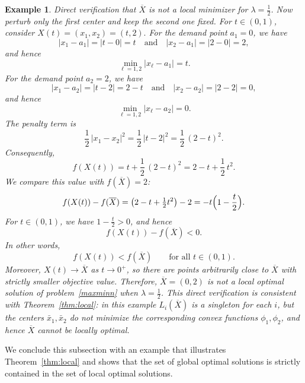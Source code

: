 \documentclass[11pt]{article}
\newtheorem{example}[theorem]{Example}
\theoremstyle{definition}
\newcommand{\1}{\mathbf{1}}
\def\Bar{\overline}
\begin{document}
\begin{example}
{\emph{Direct verification that $\Bar X$ is not a local minimizer for $\lambda=\tfrac12$.}
Now perturb only the first center and keep the second one fixed.
For $t\in(0,1)$, consider $X(t)=(x_1,x_2)=(t,2).$
For the demand point $a_1=0$, we have
\[|x_1-a_1|=|t-0|=t\quad\text{and}\quad |x_2-a_1|=|2-0|=2,\] and hence 
\[\min_{\ell=1,2}|x_\ell-a_1|=t.\]
For the demand point $a_2=2$, we have
\[|x_1-a_2|=|t-2|=2-t\quad\text{and}\quad |x_2-a_2|=|2-2|=0,\]
and hence 
\[\min_{\ell=1,2}|x_\ell-a_2|=0.\]
The penalty term is
\[\frac12\,|x_1-x_2|^2=\frac12\,|t-2|^2=\frac12\,(2-t)^2.\]
Consequently,
\[f(X(t))=t+\frac12\,(2-t)^2=
2 - t + \frac12\,t^2.\]
We compare this value with $f(\Bar X)=2$:
\[f(X(t)) - f(\Bar X)=
\bigl(2 - t + \tfrac12 t^2\bigr) - 2=
-t\Bigl(1-\frac{t}{2}\Bigr).\]
For $t\in(0,1)$, we have $1-\tfrac{t}{2}>0$, and hence
\[f(X(t)) - f(\Bar X) < 0.\]
In other words,
\[f(X(t)) < f(\Bar X)
\qquad\text{for all }t\in(0,1).\]
Moreover, $X(t)\to\Bar X$ as $t\to 0^+$, so there are points arbitrarily
close to $\Bar X$ with strictly smaller objective value. Therefore,
$\Bar X=(0,2)$ is \emph{not} a local optimal solution of problem~\eqref{maxminn} when $\lambda=\tfrac12$. 
This direct verification is consistent with Theorem~\ref{thm:local}: in this
example $L_i(\Bar X)$ is a singleton for each $i$, but the centers $\bar x_1,\bar x_2$ do not minimize the corresponding convex functions
$\phi_1,\phi_2$, and hence $\Bar X$ cannot be locally optimal.}

\end{example}



We conclude this subsection with an example that illustrates Theorem~\ref{thm:local}
and shows that the set of global optimal solutions is strictly contained in the
set of local optimal solutions.
\end{document}
